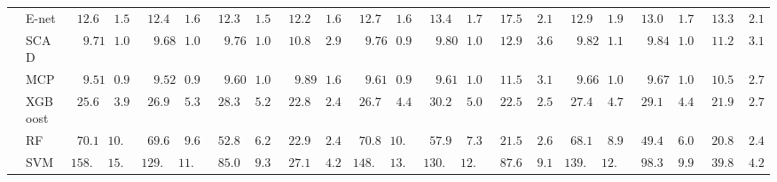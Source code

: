 \begin{tabular}{ll|ll|llllll|llllll|llllll}
 & E-net  & $\phantom{0}12.67$ & $\phantom{0}1.57$ & $\phantom{0}12.43$ & $\phantom{0}1.65$ & $\phantom{0}12.33$ & $\phantom{0}1.59$ & $\phantom{0}12.29$ & $\phantom{0}1.61$ & $\phantom{0}12.74$ & $\phantom{0}1.66$ & $\phantom{0}13.48$ & $\phantom{0}1.71$ & $\phantom{0}17.55$ & $\phantom{0}2.18$ & $\phantom{0}12.90$ & $\phantom{0}1.92$ & $\phantom{0}13.05$ & $\phantom{0}1.71$ & $\phantom{0}13.31$ & $\phantom{0}2.13$ \\
 & SCAD  & $\phantom{00}9.71$ & $\phantom{0}1.02$ & $\phantom{00}9.68$ & $\phantom{0}1.01$ & $\phantom{00}9.76$ & $\phantom{0}1.03$ & $\phantom{0}10.86$ & $\phantom{0}2.96$ & $\phantom{00}9.76$ & $\phantom{0}0.99$ & $\phantom{00}9.80$ & $\phantom{0}1.03$ & $\phantom{0}12.91$ & $\phantom{0}3.67$ & $\phantom{00}9.82$ & $\phantom{0}1.10$ & $\phantom{00}9.84$ & $\phantom{0}1.08$ & $\phantom{0}11.24$ & $\phantom{0}3.18$ \\
 & MCP  & $\phantom{00}9.51$ & $\phantom{0}0.97$ & $\phantom{00}9.52$ & $\phantom{0}0.95$ & $\phantom{00}9.60$ & $\phantom{0}1.02$ & $\phantom{00}9.89$ & $\phantom{0}1.67$ & $\phantom{00}9.61$ & $\phantom{0}0.97$ & $\phantom{00}9.61$ & $\phantom{0}1.01$ & $\phantom{0}11.58$ & $\phantom{0}3.11$ & $\phantom{00}9.66$ & $\phantom{0}1.02$ & $\phantom{00}9.67$ & $\phantom{0}1.08$ & $\phantom{0}10.51$ & $\phantom{0}2.70$ \\
 & XGBoost  & $\phantom{0}25.69$ & $\phantom{0}3.90$ & $\phantom{0}26.96$ & $\phantom{0}5.37$ & $\phantom{0}28.35$ & $\phantom{0}5.28$ & $\phantom{0}22.88$ & $\phantom{0}2.49$ & $\phantom{0}26.77$ & $\phantom{0}4.41$ & $\phantom{0}30.29$ & $\phantom{0}5.09$ & $\phantom{0}22.52$ & $\phantom{0}2.55$ & $\phantom{0}27.44$ & $\phantom{0}4.72$ & $\phantom{0}29.13$ & $\phantom{0}4.40$ & $\phantom{0}21.98$ & $\phantom{0}2.74$ \\
 & RF  & $\phantom{0}70.19$ & $10.91$ & $\phantom{0}69.60$ & $\phantom{0}9.68$ & $\phantom{0}52.80$ & $\phantom{0}6.29$ & $\phantom{0}22.99$ & $\phantom{0}2.40$ & $\phantom{0}70.83$ & $10.21$ & $\phantom{0}57.90$ & $\phantom{0}7.36$ & $\phantom{0}21.57$ & $\phantom{0}2.68$ & $\phantom{0}68.14$ & $\phantom{0}8.93$ & $\phantom{0}49.46$ & $\phantom{0}6.04$ & $\phantom{0}20.88$ & $\phantom{0}2.45$ \\
 & SVM  & $158.45$ & $15.21$ & $129.86$ & $11.43$ & $\phantom{0}85.01$ & $\phantom{0}9.37$ & $\phantom{0}27.14$ & $\phantom{0}4.26$ & $148.54$ & $13.88$ & $130.69$ & $12.51$ & $\phantom{0}87.63$ & $\phantom{0}9.18$ & $139.80$ & $12.99$ & $\phantom{0}98.33$ & $\phantom{0}9.93$ & $\phantom{0}39.83$ & $\phantom{0}4.25$ \\\hline

\end{tabular}
